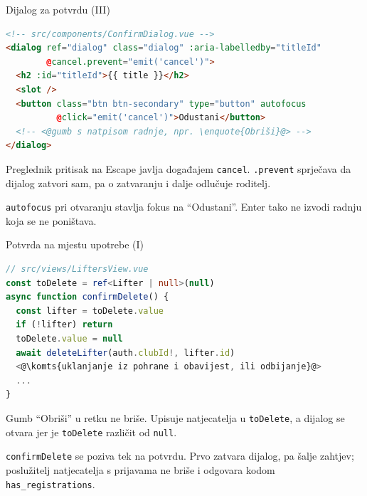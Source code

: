 \begin{frame}[fragile]{Dijalog za potvrdu (III)}
\begin{lstlisting}[language=html]
<!-- src/components/ConfirmDialog.vue -->
<dialog ref="dialog" class="dialog" :aria-labelledby="titleId"
        @cancel.prevent="emit('cancel')">
  <h2 :id="titleId">{{ title }}</h2>
  <slot />
  <button class="btn btn-secondary" type="button" autofocus
          @click="emit('cancel')">Odustani</button>
  <!-- <@gumb s natpisom radnje, npr. \enquote{Obriši}@> -->
</dialog>
\end{lstlisting}

\vspace{0.3em}
Preglednik pritisak na Escape javlja događajem \texttt{cancel}. \texttt{.prevent} sprječava da dijalog zatvori sam, pa o zatvaranju i dalje odlučuje roditelj.

\vspace{0.3em}
\texttt{autofocus} pri otvaranju stavlja fokus na \enquote{Odustani}. Enter tako ne izvodi radnju koja se ne poništava.
\end{frame}

\begin{frame}[fragile]{Potvrda na mjestu upotrebe (I)}
\begin{lstlisting}[language=typescript]
// src/views/LiftersView.vue
const toDelete = ref<Lifter | null>(null)
async function confirmDelete() {
  const lifter = toDelete.value
  if (!lifter) return
  toDelete.value = null
  await deleteLifter(auth.clubId!, lifter.id)
  <@\komts{uklanjanje iz pohrane i obavijest, ili odbijanje}@>
  ...
}
\end{lstlisting}

\vspace{0.3em}
Gumb \enquote{Obriši} u retku ne briše. Upisuje natjecatelja u \texttt{toDelete}, a dijalog se otvara jer je \texttt{toDelete} različit od \texttt{null}.

\vspace{0.3em}
\texttt{confirmDelete} se poziva tek na potvrdu. Prvo zatvara dijalog, pa šalje zahtjev; poslužitelj natjecatelja s prijavama ne briše i odgovara kodom \texttt{has\_registrations}.
\end{frame}

